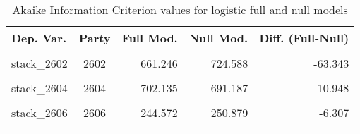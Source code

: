 \documentclass[
]{article}
\begin{document}
\begin{table}[!h]

\caption{\label{tab:unnamed-chunk-172}Akaike Information Criterion values for logistic full and null models 
        \label{table:logit_aic_es}}
\centering
\begin{tabular}[t]{lcrrr}
\toprule
Dep. Var. & Party & Full Mod. & Null Mod. & Diff. (Full-Null)\\
\midrule
\cellcolor{gray!6}{stack\_2601} & \cellcolor{gray!6}{2601} & \cellcolor{gray!6}{1034.103} & \cellcolor{gray!6}{1023.898} & \cellcolor{gray!6}{10.205}\\
stack\_2602 & 2602 & 661.246 & 724.588 & -63.343\\
\cellcolor{gray!6}{stack\_2603} & \cellcolor{gray!6}{2603} & \cellcolor{gray!6}{642.191} & \cellcolor{gray!6}{671.944} & \cellcolor{gray!6}{-29.752}\\
stack\_2604 & 2604 & 702.135 & 691.187 & 10.948\\
\cellcolor{gray!6}{stack\_2605} & \cellcolor{gray!6}{2605} & \cellcolor{gray!6}{411.134} & \cellcolor{gray!6}{414.884} & \cellcolor{gray!6}{-3.750}\\
\addlinespace
stack\_2606 & 2606 & 244.572 & 250.879 & -6.307\\
\cellcolor{gray!6}{stack\_2609} & \cellcolor{gray!6}{2609} & \cellcolor{gray!6}{88.819} & \cellcolor{gray!6}{83.795} & \cellcolor{gray!6}{5.024}\\
\bottomrule
\end{tabular}
\end{table}
\end{document}
